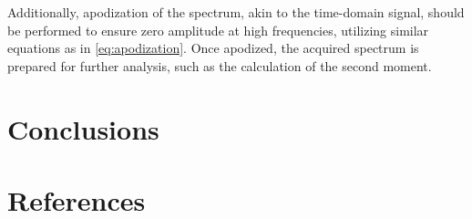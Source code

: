 \documentclass[a4paper,12pt]{article}
\begin{document}
Additionally, apodization of the spectrum, akin to the time-domain signal, should be performed to ensure zero amplitude at high frequencies, utilizing similar equations as in \cref{eq:apodization}. 
Once apodized, the acquired spectrum is prepared for further analysis, such as the calculation of the second moment.


\newpage
\section{Conclusions}

\newpage
\section{References}
\printbibliography
\end{document}
